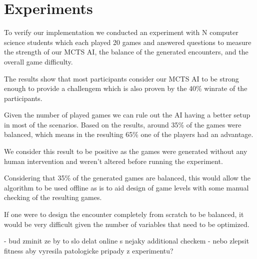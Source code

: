 \chapter{Experiments}

To verify our implementation we conducted an experiment with N 
computer science students which each played 20 games and answered questions
to measure the strength of our MCTS AI, the balance of the generated encounters,
and the overall game difficulty.


The results show that most participants consider our MCTS AI to be strong
enough to provide a challengem which is also proven by the 40\% winrate of
the participants. 

Given the number of played games  we can
rule out the AI having a better setup in most of the scenarios. Based on the
results, around 35\%  of the games were balanced,
which means in the resulting 65\% one of the players had an advantage.

We consider this result to be positive as the games were generated without
any human intervention and weren't altered before running the experiment.

Considering that 35\% of the generated games are balanced, this would allow
the algorithm to be used offline as is to aid design of game levels with
some manual checking of the resulting games.

If one were to design the encounter completely from scratch to be balanced,
it would be very difficult given the number of variables that need to be
optimized.

- bud zminit ze by to slo delat online s nejaky additional checkem
- nebo zlepsit fitness aby vyresila patologicke pripady z experimentu?
